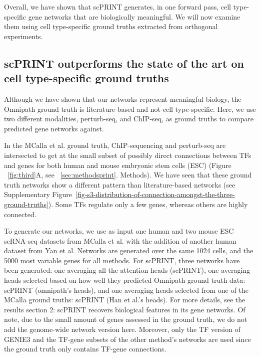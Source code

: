 Overall, we have shown that \gls{scPRINT} generates, in one forward pass, cell type-specific gene networks that are biologically meaningful. We will now examine them using cell type-specific ground truths extracted from orthogonal experiments.

\subsection{scPRINT outperforms the state of the art on cell type-specific ground truths}

Although we have shown that our networks represent meaningful biology, the Omnipath ground truth is literature-based and not cell type-specific. Here, we use two different modalities, perturb-seq\citep{dixitPerturbseqDissectingMolecular2016}, and \gls{ChIP-seq}\citep{parkChIPSeqAdvantages2009}, as ground truths to compare predicted gene networks against.

In the MCalla et al.\citep{mccallaIdentifyingStrengthsWeaknesses2023} ground truth, \gls{ChIP-seq}uencing and perturb-seq are intersected to get at the small subset of possibly direct connections between \gls{TF}s and genes for both human and mouse embryonic stem cells (ESC) (Figure ~\ref{fig:third}A, see ~\ref{sec:methodsprint}. Methods). We have seen that these ground truth networks show a different pattern than literature-based networks (see Supplementary Figure~\ref{fig-s3-distribution-of-connection-amongst-the-three-ground-truths}). Some \gls{TF}s regulate only a few genes, whereas others are highly connected.

To generate our networks, we use as input one human and two mouse ESC \gls{scRNA-seq} datasets from MCalla et al. with the addition of another human dataset from Yan et al.\citep{yanSinglecellRNASeqProfiling2013} Networks are generated over the same 1024 cells, and the 5000 most variable genes for all methods. For \gls{scPRINT}, three networks have been generated: one averaging all the attention heads (\gls{scPRINT}), one averaging heads selected based on how well they predicted Omnipath ground truth data: \gls{scPRINT} (omnipath's heads), and one averaging heads selected from one of the MCalla ground truths: \gls{scPRINT} (Han et al.'s heads). For more details, see the results section 2: \gls{scPRINT} recovers biological features in its gene networks. Of note, due to the small amount of genes assessed in the ground truth, we do not add the genome-wide network version here. Moreover, only the \gls{TF} version of GENIE3 and the \gls{TF}-gene subsets of the other method's networks are used since the ground truth only contains \gls{TF}-gene connections.

